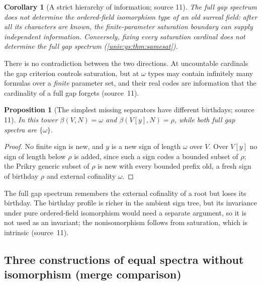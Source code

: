 \documentclass[11pt,letterpaper]{article}
\numberwithin{equation}{section}
\newtheorem{proposition}[proposition]{Proposition}
\newtheorem{corollary}[corollary]{Corollary}
\theoremstyle{definition}
\theoremstyle{remark}
\begin{document}
\begin{corollary}[A strict hierarchy of information; source 11]\label{univ:gs:cor:hierarchy}
The full gap spectrum does not determine the ordered-field isomorphism type of an old surreal field:
after all its characters are known, the finite-parameter saturation boundary can supply independent
information. Conversely, fixing every saturation cardinal does not determine the full gap spectrum
(\cref{univ:gs:thm:samesat}).
\end{corollary}

There is no contradiction between the two directions. At uncountable cardinals the gap criterion
controls saturation, but at $\omega$ types may contain infinitely many formulas over a \emph{finite}
parameter set, and their real codes are information that the cardinality of a full gap forgets
(source~11).

\begin{proposition}[The simplest missing separators have different birthdays; source 11]\label{univ:gs:prop:birthdays}
In this tower $\beta(V,N)=\omega$ and $\beta(V[y],N)=\rho$, while both full gap spectra are
$\{\omega\}$.
\end{proposition}
\begin{proof}
No finite sign is new, and $y$ is a new sign of length $\omega$ over $V$. Over $V[y]$ no sign of
length below $\rho$ is added, since such a sign codes a bounded subset of $\rho$; the Prikry
generic subset of $\rho$ is new with every bounded prefix old, a fresh sign of birthday $\rho$ and
external cofinality $\omega$.
\end{proof}

The full gap spectrum remembers the external cofinality of a root but loses its birthday. The
birthday profile is richer in the ambient sign tree, but its invariance under pure ordered-field
isomorphism would need a separate argument, so it is not used as an invariant; the nonisomorphism
follows from saturation, which is intrinsic (source~11).

\subsection{Three constructions of equal spectra without isomorphism (merge comparison)}
\end{document}
